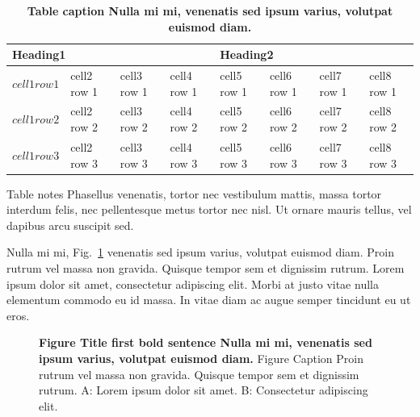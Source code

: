 \documentclass[10pt,letterpaper]{article}
\begin{document}
\begin{table}[!ht]
\begin{adjustwidth}{-2.25in}{0in} %
\caption{
{\bf Table caption Nulla mi mi, venenatis sed ipsum varius, volutpat euismod diam.}}
\begin{tabular}{|l|l|l|l|l|l|l|l|}
\hline
\multicolumn{4}{|l|}{\bf Heading1} & \multicolumn{4}{|l|}{\bf Heading2}\\ \hline
$cell1 row1$ & cell2 row 1 & cell3 row 1 & cell4 row 1 & cell5 row 1 & cell6 row 1 & cell7 row 1 & cell8 row 1\\ \hline
$cell1 row2$ & cell2 row 2 & cell3 row 2 & cell4 row 2 & cell5 row 2 & cell6 row 2 & cell7 row 2 & cell8 row 2\\ \hline
$cell1 row3$ & cell2 row 3 & cell3 row 3 & cell4 row 3 & cell5 row 3 & cell6 row 3 & cell7 row 3 & cell8 row 3\\ \hline
\end{tabular}
\begin{flushleft} Table notes Phasellus venenatis, tortor nec vestibulum mattis, massa tortor interdum felis, nec pellentesque metus tortor nec nisl. Ut ornare mauris tellus, vel dapibus arcu suscipit sed.
\end{flushleft}
\label{table1}
\end{adjustwidth}
\end{table}

Nulla mi mi, Fig.~\ref{fig1} venenatis sed ipsum varius, volutpat euismod diam. Proin rutrum vel massa non gravida. Quisque tempor sem et dignissim rutrum. Lorem ipsum dolor sit amet, consectetur adipiscing elit. Morbi at justo vitae nulla elementum commodo eu id massa. In vitae diam ac augue semper tincidunt eu ut eros. 


\begin{figure}[h]
\caption{{\bf Figure Title first bold sentence Nulla mi mi, venenatis sed ipsum varius, volutpat euismod diam.}
Figure Caption Proin rutrum vel massa non gravida. Quisque tempor sem et dignissim rutrum. A: Lorem ipsum dolor sit amet. B: Consectetur adipiscing elit.}
\label{fig1}
\end{figure}


\end{document}
